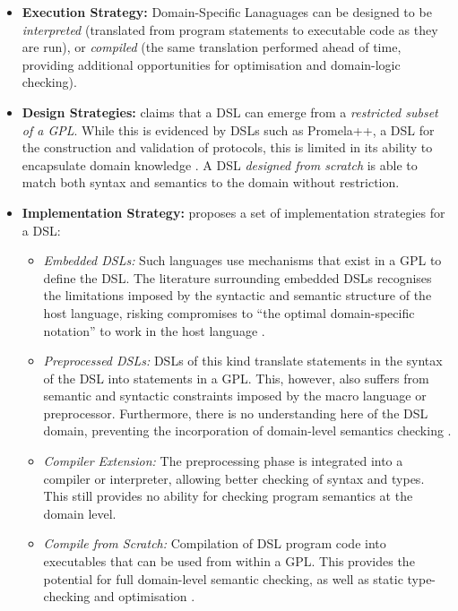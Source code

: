 \documentclass[a4paper,11pt]{report}
\begin{document}
\begin{itemize}
    \item \textbf{Execution Strategy:} Domain-Specific Lanaguages can be designed to be \textit{interpreted} (translated from program statements to executable code as they are run), or \textit{compiled} (the same translation performed ahead of time, providing additional opportunities for optimisation and domain-logic checking).
    \item \textbf{Design Strategies:} \citet{van2000domain} claims that a DSL can emerge from a \textit{restricted subset of a GPL}. 
    While this is evidenced by DSLs such as Promela++, a DSL for the construction and validation of protocols, this is limited in its ability to encapsulate domain knowledge \citep{basu1997language}.
    A DSL \textit{designed from scratch} is able to match both syntax and semantics to the domain without restriction. 
    \item \textbf{Implementation Strategy:} \citet{van2000domain} proposes a set of implementation strategies for a DSL:
    \begin{itemize}
        \item \textit{Embedded DSLs:} Such languages use mechanisms that exist in a GPL to define the DSL. 
        The literature surrounding embedded DSLs recognises the limitations imposed by the syntactic and semantic structure of the host language, risking compromises to ``the optimal domain-specific notation'' to work in the host language \citep[pg. 3]{van2000domain}.
        \item \textit{Preprocessed DSLs:} DSLs of this kind translate statements in the syntax of the DSL into statements in a GPL. 
        This, however, also suffers from semantic and syntactic constraints imposed by the macro language or preprocessor. 
        Furthermore, there is no understanding here of the DSL domain, preventing the incorporation of domain-level semantics checking \citep{van2000domain}.
        \item \textit{Compiler Extension:} The preprocessing phase is integrated into a compiler or interpreter, allowing better checking of syntax and types.
        This still provides no ability for checking program semantics at the domain level. 
        \item \textit{Compile from Scratch:} Compilation of DSL program code into executables that can be used from within a GPL. 
        This provides the potential for full domain-level semantic checking, as well as static type-checking and optimisation \citep{van2000domain}.
    \end{itemize}
\end{itemize}
\end{document}
